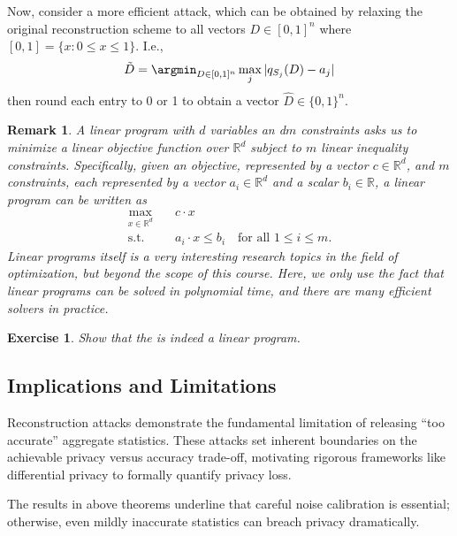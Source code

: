 \documentclass[11pt, a4paper]{article}
\newtheorem{exercise}{Exercise}
\newtheorem{remark}{Remark}
\begin{document}
Now, consider a more efficient attack, which can be obtained by relaxing the original reconstruction scheme to all vectors $D\in[0, 1]^n$ where $[0, 1] = \{x:0\leq x\leq 1\}$.
I.e.,
\begin{align}
    \tilde{D} = \argmin_{D\in[0, 1]^n} \max_j |q_{S_j}(D) - a_j|\label{eq:lp}
\end{align}
then round each entry to 0 or 1 to obtain a vector $\hat{D} \in \{0, 1\}^n$.

\begin{remark}
    A linear program with $d$ variables an d$m$ constraints asks us to minimize a linear objective function over $\mathbb{R}^d$ subject to $m$ linear inequality constraints.
    Specifically, given an objective, represented by a vector $c\in\mathbb{R}^d$, and $m$ constraints, each represented by a vector $a_i\in \mathbb{R}^d$ and a scalar $b_i\in\mathbb{R}$,
    a linear program can be written as
    \begin{align}
        \max_{x\in\mathbb{R}^d} &\quad c\cdot x\\
        \textrm{s.t.}             &\quad a_i\cdot x \leq b_i \quad\mbox{for all $1\leq i\leq m$}.
    \end{align}
    Linear programs itself is a very interesting research topics in the field of optimization, but beyond the scope of this course.
    Here, we only use the fact that linear programs can be solved in polynomial time, and there are many efficient solvers in practice. 
\end{remark}

\begin{exercise}
    Show that the  is indeed a linear program.
\end{exercise}




\subsection{Implications and Limitations}

Reconstruction attacks demonstrate the fundamental limitation of releasing ``too accurate'' aggregate statistics.
These attacks set inherent boundaries on the achievable privacy versus accuracy trade-off,
motivating rigorous frameworks like differential privacy to formally quantify privacy loss.

The results in above theorems underline that careful noise calibration is essential;
otherwise, even mildly inaccurate statistics can breach privacy dramatically.
\end{document}
